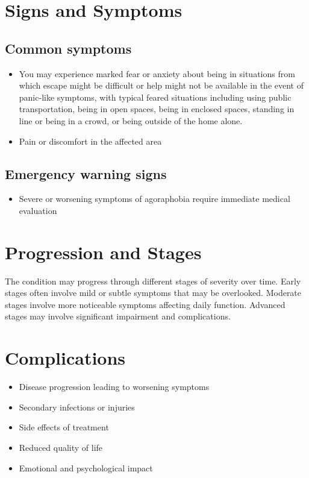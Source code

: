\section{Signs and Symptoms}
\subsection{Common symptoms}
\begin{itemize}[noitemsep]
  \item You may experience marked fear or anxiety about being in situations from which escape might be difficult or help might not be available in the event of panic-like symptoms, with typical feared situations including using public transportation, being in open spaces, being in enclosed spaces, standing in line or being in a crowd, or being outside of the home alone.
  \item Pain or discomfort in the affected area
  \end{itemize}
\subsection{Emergency warning signs}
\begin{itemize}[noitemsep]
  \item Severe or worsening symptoms of agoraphobia require immediate medical evaluation
\end{itemize}
\section{Progression and Stages}
The condition may progress through different stages of severity over time. Early stages often involve mild or subtle symptoms that may be overlooked. Moderate stages involve more noticeable symptoms affecting daily function. Advanced stages may involve significant impairment and complications.
\section{Complications}
\begin{itemize}[noitemsep]
  \item Disease progression leading to worsening symptoms
  \item Secondary infections or injuries
  \item Side effects of treatment
  \item Reduced quality of life
  \item Emotional and psychological impact
\end{itemize}
